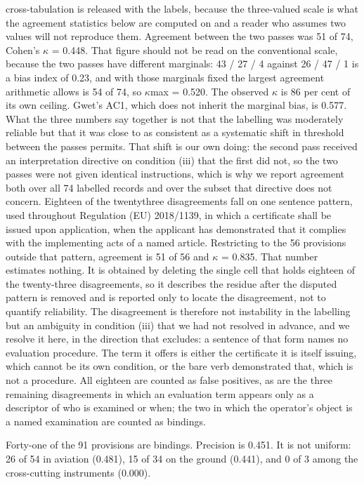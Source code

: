 cross-tabulation is released with the labels, because the three-valued scale is what the agreement statistics below are computed on and a reader who assumes two values will not reproduce them. Agreement between the two passes was 51 of 74, Cohen's $\kappa$ = 0.448. That figure should not be read on the conventional scale, because the two passes have different marginals: 43 / 27 / 4 against 26 / 47 / 1 is a bias index of 0.23, and with those marginals fixed the largest agreement arithmetic allows is 54 of 74, so $\kappa$max = 0.520. The observed $\kappa$ is 86 per cent of its own ceiling. Gwet's AC1, which does not inherit the marginal bias, is 0.577. What the three numbers say together is not that the labelling was moderately reliable but that it was close to as consistent as a systematic shift in threshold between the passes permits. That shift is our own doing: the second pass received an interpretation directive on condition (iii) that the first did not, so the two passes were not given identical instructions, which is why we report agreement both over all 74 labelled records and over the subset that directive does not concern. Eighteen of the twentythree disagreements fall on one sentence pattern, used throughout Regulation (EU) 2018/1139, in which a certificate shall be issued upon application, when the applicant has demonstrated that it complies with the implementing acts of a named article. Restricting to the 56 provisions outside that pattern, agreement is 51 of 56 and $\kappa$ = 0.835. That number estimates nothing. It is obtained by deleting the single cell that holds eighteen of the twenty-three disagreements, so it describes the residue after the disputed pattern is removed and is reported only to locate the disagreement, not to quantify reliability. The disagreement is therefore not instability in the labelling but an ambiguity in condition (iii) that we had not resolved in advance, and we resolve it here, in the direction that excludes: a sentence of that form names no evaluation procedure. The term it offers is either the certificate it is itself issuing, which cannot be its own condition, or the bare verb demonstrated that, which is not a procedure. All eighteen are counted as false positives, as are the three remaining disagreements in which an evaluation term appears only as a descriptor of who is examined or when; the two in which the operator's object is a named examination are counted as bindings.

Forty-one of the 91 provisions are bindings. Precision is 0.451. It is not uniform: 26 of 54 in aviation (0.481), 15 of 34 on the ground (0.441), and 0 of 3 among the cross-cutting instruments (0.000).

